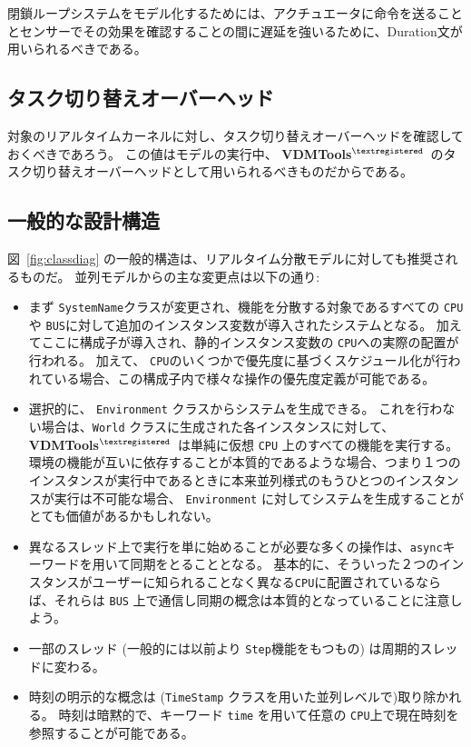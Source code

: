 \documentclass[\pformat,12pt]{jreport}
\newcommand{\vdmtools}{\textbf{VDMTools}$^{\mathbf{{\textregistered}}}$}
\begin{document}
閉鎖ループシステムをモデル化するためには、アクチュエータに命令を送ることとセンサーでその効果を確認することの間に遅延を強いるために、Duration文が用いられるべきである。

\subsection{タスク切り替えオーバーヘッド}

対象のリアルタイムカーネルに対し、タスク切り替えオーバーヘッドを確認しておくべきであろう。
この値はモデルの実行中、 \vdmtools\ のタスク切り替えオーバーヘッドとして用いられるべきものだからである。

\subsection{一般的な設計構造}\label{sec:designvice}

図~\ref{fig:classdiag} の一般的構造は、リアルタイム分散モデルに対しても推奨されるものだ。
並列モデルからの主な変更点は以下の通り:

\begin{itemize}
\item まず \texttt{SystemName}クラスが変更され、機能を分散する対象であるすべての \texttt{CPU}や \texttt{BUS}に対して追加のインスタンス変数が導入されたシステムとなる。
加えてここに構成子が導入され、静的インスタンス変数の \texttt{CPU}への実際の配置が行われる。
加えて、 \texttt{CPU}のいくつかで優先度に基づくスケジュール化が行われている場合、この構成子内で様々な操作の優先度定義が可能である。
\item 選択的に、 \texttt{Environment} クラスからシステムを生成できる。
これを行わない場合は、\texttt{World} クラスに生成された各インスタンスに対して、 \vdmtools\ は単純に仮想 \texttt{CPU} 上のすべての機能を実行する。
環境の機能が互いに依存することが本質的であるような場合、つまり１つのインスタンスが実行中であるときに本来並列様式のもうひとつのインスタンスが実行は不可能な場合、 \texttt{Environment} に対してシステムを生成することがとても価値があるかもしれない。
\item 
異なるスレッド上で実行を単に始めることが必要な多くの操作は、\texttt{async}キーワードを用いて同期をとることとなる。
基本的に、そういった２つのインスタンスがユーザーに知られることなく異なる\texttt{CPU}に配置されているならば、それらは \texttt{BUS} 上で通信し同期の概念は本質的となっていることに注意しよう。
\item 一部のスレッド (一般的には以前より \texttt{Step}機能をもつもの) は周期的スレッドに変わる。
\item 時刻の明示的な概念は (\texttt{TimeStamp} クラスを用いた並列レベルで)取り除かれる。
時刻は暗黙的で、キーワード \texttt{time} を用いて任意の \texttt{CPU}上で現在時刻を参照することが可能である。
\end{itemize}
\end{document}
